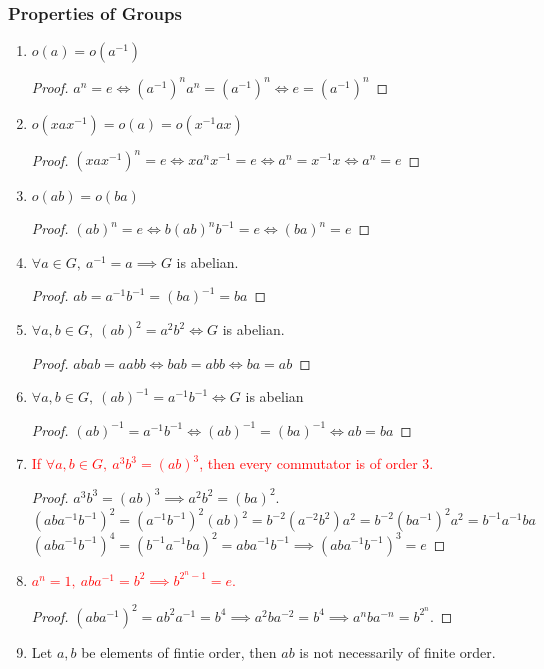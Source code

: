 \subsubsection{Properties of Groups}
\begin{enumerate}
	\item $o(a)=o(a^{-1})$
	\begin{proof}
		$a^n = e \iff (a^{-1})^n a^n = (a^{-1})^n \iff e = (a^{-1})^n$
	\end{proof}
	\item $o(xax^{-1}) = o(a) = o(x^{-1}ax)$
	\begin{proof}
		$(xax^{-1})^n = e \iff  xa^nx^{-1} = e \iff a^n = x^{-1}x \iff a^n = e$
	\end{proof}
	\item $o(ab) = o(ba)$
	\begin{proof}
		$(ab)^n = e \iff b(ab)^nb^{-1} = e \iff (ba)^n = e$
	\end{proof}
	\item $\forall a \in G,\ a^{-1} = a \implies G$ is abelian.
	\begin{proof}
		$ab = a^{-1}b^{-1} = (ba)^{-1} = ba$
	\end{proof}
	\item $\forall a,b \in G,\ (ab)^2 = a^2b^2 \iff G$ is abelian.
	\begin{proof}
		$abab = aabb \iff bab = abb \iff ba = ab$
	\end{proof}
	\item $\forall a,b \in G,\ (ab)^{-1} = a^{-1}b^{-1} \iff G$ is abelian
	\begin{proof}
		$(ab)^{-1} = a^{-1}b^{-1} \iff (ab)^{-1} = (ba)^{-1} \iff ab = ba$
	\end{proof}
\item \textcolor{red}{If $\forall a,b \in G,\ a^3b^3 = (ab)^3$, then every commutator is of order $3$.}
	\begin{proof}
	$a^3b^3 = (ab)^3 \implies a^2b^2 = (ba)^2$.
	$$(aba^{-1}b^{-1})^2 = (a^{-1}b^{-1})^2(ab)^2 = b^{-2}(a^{-2}b^2)a^2 = b^{-2}(ba^{-1})^2a^2 = b^{-1}a^{-1}ba$$
		$(aba^{-1}b^{-1})^4 = (b^{-1}a^{-1}ba)^2 = aba^{-1}b^{-1} \implies (aba^{-1}b^{-1})^3 = e$
	\end{proof}
	\item \textcolor{red}{$a^n = 1,\ aba^{-1} = b^2 \implies b^{2^n-1} = e$.}
	\begin{proof}
		$(aba^{-1})^2 = ab^2a^{-1} = b^4 \implies a^2ba^{-2} = b^4 \implies a^nba^{-n}=b^{2^n}$.
	\end{proof}
	\item Let $a,b$ be elements of fintie order, then $ab$ is not necessarily of finite order.

\end{enumerate}
